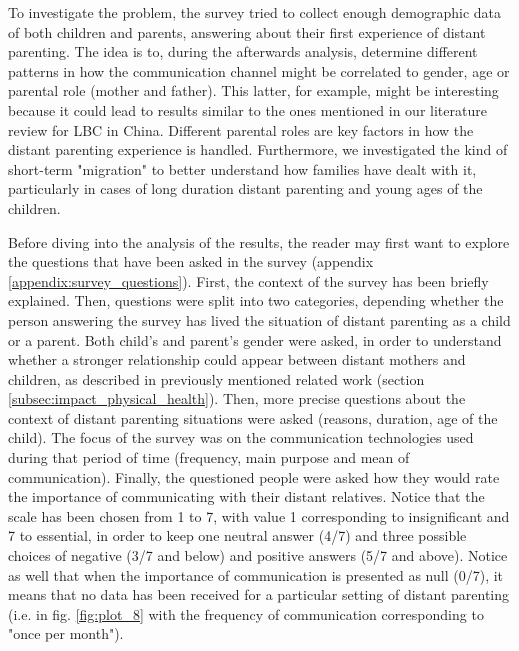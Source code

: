 To investigate the problem, the survey tried to collect enough demographic data of both children and parents, answering about their first experience of distant parenting. The idea is to, during the afterwards analysis, determine different patterns in how the communication channel might be correlated to gender, age or parental role (mother and father). This latter, for example, might be interesting because it could lead to results similar to the ones mentioned in our literature review for LBC in China. Different parental roles are key factors in how the distant parenting experience is handled. 
Furthermore, we investigated the kind of short-term "migration" to better understand how families have dealt with it, particularly in cases of long duration distant parenting and young ages of the children. 

Before diving into the analysis of the results, the reader may first want to explore the questions that have been asked in the survey (appendix \ref{appendix:survey_questions}). First, the context of the survey has been briefly explained. Then, questions were split into two categories, depending whether the person answering the survey has lived the situation of distant parenting as a child or a parent. Both child's and parent's gender were asked, in order to understand whether a stronger relationship could appear between distant mothers and children, as described in previously mentioned related work (section \ref{subsec:impact_physical_health}). Then, more precise questions about the context of distant parenting situations were asked (reasons, duration, age of the child). The focus of the survey was on the communication technologies used during that period of time (frequency, main purpose and mean of communication). Finally, the questioned people were asked how they would rate the importance of communicating with their distant relatives. Notice that the scale has been chosen from 1 to 7, with value 1 corresponding to insignificant and 7 to essential, in order to keep one neutral answer (4/7) and three possible choices of negative (3/7 and below) and positive answers (5/7 and above). Notice as well that when the importance of communication is presented as null (0/7), it means that no data has been received for a particular setting of distant parenting (i.e. in fig. \ref{fig:plot_8} with the frequency of communication corresponding to "once per month").


